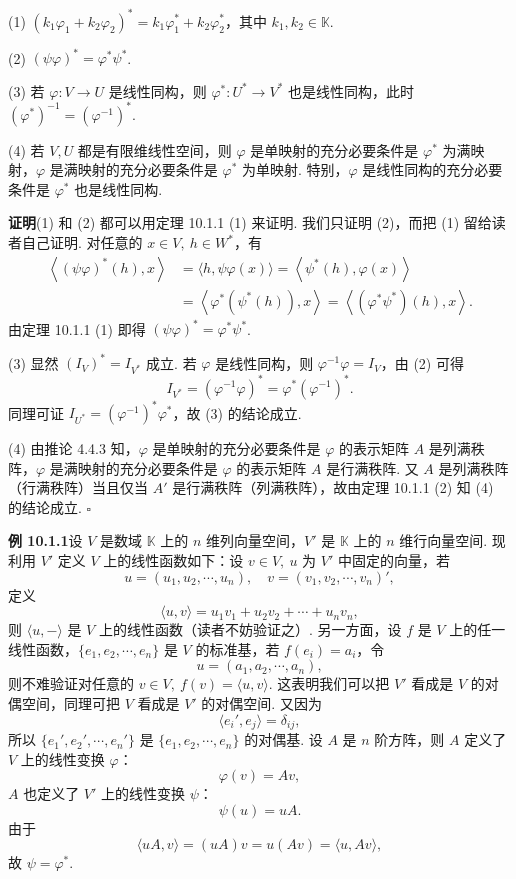 \documentclass[UTF8,12pt,a4paper,fontset=fandol]{ctexart}
\begin{document}
(1) $(k_1\varphi_1+k_2\varphi_2)^*=k_1\varphi_1^*+k_2\varphi_2^*$，其中 $k_1,k_2\in\mathbb K$.

(2) $(\psi\varphi)^*=\varphi^*\psi^*$.

(3) 若 $\varphi:V\to U$ 是线性同构，则 $\varphi^*:U^*\to V^*$ 也是线性同构，此时 $(\varphi^*)^{-1}=(\varphi^{-1})^*$.

(4) 若 $V,U$ 都是有限维线性空间，则 $\varphi$ 是单映射的充分必要条件是 $\varphi^*$ 为满映射，$\varphi$ 是满映射的充分必要条件是 $\varphi^*$ 为单映射. 特别，$\varphi$ 是线性同构的充分必要条件是 $\varphi^*$ 也是线性同构.

\noindent\textbf{证明}\quad (1) 和 (2) 都可以用定理 10.1.1 (1) 来证明. 我们只证明 (2)，而把 (1) 留给读者自己证明. 对任意的 $x\in V,\ h\in W^*$，有
\[
\begin{aligned}
  \left\langle(\psi\varphi)^*(h),x\right\rangle
  &=\langle h,\psi\varphi(x)\rangle=\left\langle\psi^*(h),\varphi(x)\right\rangle\\
  &=\left\langle\varphi^*(\psi^*(h)),x\right\rangle
  =\left\langle(\varphi^*\psi^*)(h),x\right\rangle.
\end{aligned}
\]
由定理 10.1.1 (1) 即得 $(\psi\varphi)^*=\varphi^*\psi^*$.

(3) 显然 $(I_V)^*=I_{V^*}$ 成立. 若 $\varphi$ 是线性同构，则 $\varphi^{-1}\varphi=I_V$，由 (2) 可得
\[
  I_{V^*}=(\varphi^{-1}\varphi)^*=\varphi^*(\varphi^{-1})^*.
\]
同理可证 $I_{U^*}=(\varphi^{-1})^*\varphi^*$，故 (3) 的结论成立.

(4) 由推论 4.4.3 知，$\varphi$ 是单映射的充分必要条件是 $\varphi$ 的表示矩阵 $A$ 是列满秩阵，$\varphi$ 是满映射的充分必要条件是 $\varphi$ 的表示矩阵 $A$ 是行满秩阵. 又 $A$ 是列满秩阵（行满秩阵）当且仅当 $A'$ 是行满秩阵（列满秩阵），故由定理 10.1.1 (2) 知 (4) 的结论成立. $\square$

\noindent\textbf{例 10.1.1}\quad 设 $V$ 是数域 $\mathbb K$ 上的 $n$ 维列向量空间，$V'$ 是 $\mathbb K$ 上的 $n$ 维行向量空间. 现利用 $V'$ 定义 $V$ 上的线性函数如下：设 $v\in V,\ u$ 为 $V'$ 中固定的向量，若
\[
  u=(u_1,u_2,\cdots,u_n),\quad v=(v_1,v_2,\cdots,v_n)',
\]
定义
\[
  \langle u,v\rangle=u_1v_1+u_2v_2+\cdots+u_nv_n,
\]
则 $\langle u,-\rangle$ 是 $V$ 上的线性函数（读者不妨验证之）. 另一方面，设 $f$ 是 $V$ 上的任一线性函数，$\{e_1,e_2,\cdots,e_n\}$ 是 $V$ 的标准基，若 $f(e_i)=a_i$，令
\[
  u=(a_1,a_2,\cdots,a_n),
\]
则不难验证对任意的 $v\in V,\ f(v)=\langle u,v\rangle$. 这表明我们可以把 $V'$ 看成是 $V$ 的对偶空间，同理可把 $V$ 看成是 $V'$ 的对偶空间. 又因为
\[
  \langle e_i',e_j\rangle=\delta_{ij},
\]
所以 $\{e_1',e_2',\cdots,e_n'\}$ 是 $\{e_1,e_2,\cdots,e_n\}$ 的对偶基. 设 $A$ 是 $n$ 阶方阵，则 $A$ 定义了 $V$ 上的线性变换 $\varphi$：
\[
  \varphi(v)=Av,
\]
$A$ 也定义了 $V'$ 上的线性变换 $\psi$：
\[
  \psi(u)=uA.
\]
由于
\[
  \langle uA,v\rangle=(uA)v=u(Av)=\langle u,Av\rangle,
\]
故 $\psi=\varphi^*$.
\end{document}
